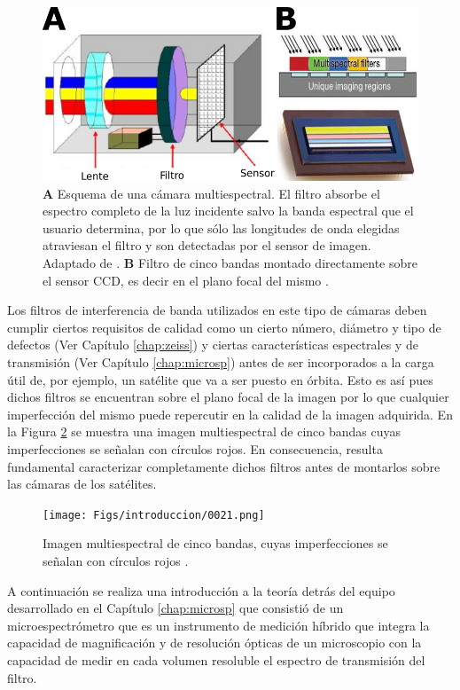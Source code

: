\begin{figure}[H]
\centering
\includegraphics[width=1.0\textwidth]{Figs/introduccion/camsensor.png}
\caption{\textbf{A} Esquema de una cámara multiespectral. El filtro absorbe el espectro completo de la luz incidente salvo la banda espectral que el usuario determina, por lo que sólo las longitudes de onda elegidas atraviesan el filtro y son detectadas por el sensor de imagen. Adaptado de \cite{Martinez2008}. \textbf{B} Filtro de cinco bandas montado directamente sobre el sensor CCD, es decir en el plano focal del mismo \cite{sensarrib}.}
\label{fig:esquemcamypegfilt}
\end{figure}

 Los filtros de interferencia de banda 
utilizados en este tipo de cámaras deben cumplir ciertos requisitos de calidad como un cierto número, diámetro y tipo de defectos (Ver Capítulo \ref{chap:zeiss}) y ciertas características espectrales y de transmisión (Ver Capítulo \ref{chap:microsp}) antes de ser 
incorporados a la carga útil de, por ejemplo, un satélite que va a ser puesto 
en 
órbita. Esto es así pues dichos filtros se encuentran sobre el plano focal de la imagen por lo que cualquier imperfección del mismo puede repercutir en la calidad de la imagen adquirida. En la Figura \ref{fig:speus} se muestra una imagen multiespectral de cinco bandas cuyas imperfecciones se señalan con círculos rojos. En consecuencia, resulta fundamental caracterizar completamente dichos filtros antes de montarlos sobre las cámaras de los satélites.

\begin{figure}[H]
	\centering
	\texttt{[image: Figs/introduccion/0021.png]}
	\caption{Imagen multiespectral de cinco bandas, cuyas imperfecciones se señalan con círculos rojos .}
	\label{fig:speus}
\end{figure}

A continuación se realiza una introducción a la teoría detrás del equipo desarrollado en el Capítulo \ref{chap:microsp} que consistió de un microespectrómetro que es un instrumento de medición híbrido que integra la capacidad de magnificación y de resolución ópticas de un microscopio con la capacidad de medir en cada volumen resoluble el espectro de transmisión del filtro.

